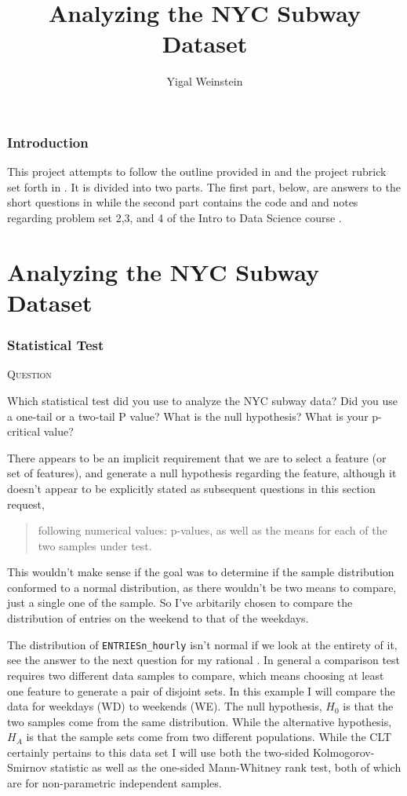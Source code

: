 \documentclass{article}
\title{Analyzing the NYC Subway Dataset}
\author{Yigal Weinstein}
\newcounter{questionCtr}
\newenvironment{question}{%
   \bigskip\noindent%
   \refstepcounter{questionCtr}%
   \textsc{Question \thequestionCtr}%
   \newline%
   }{\par\bigskip}  %
\numberwithin{questionCtr}{section}
\numberwithin{problemCtr}{section}
\begin{document}
\maketitle
\section*{Introduction}
This project attempts to follow the outline provided in \cite{Udacity-P2-DS}
and the project rubrick set forth in \cite{Udacity-P2-rubrick}.  It is divided
into two parts.  The first part, below, are answers to the short questions in
\cite{Udacity-P2-DS} while the second part contains the code and and notes
regarding problem set 2,3, and 4 of the Intro to Data Science course
\cite{Udacity-data-science-course}.
\part{Analyzing the NYC Subway Dataset}
\section{Statistical Test}
\label{sec:statistical_test_one}
\begin{question}
  Which statistical test did you use to analyze the NYC subway data? Did you use
  a one-tail or a two-tail P value? What is the null hypothesis? What is your
  p-critical value?
\end{question}
There appears to be an implicit requirement that we are to select a feature (or
set of features), and generate a null hypothesis regarding the feature, although
it doesn't appear to be explicitly stated as subsequent questions in this
section request,

\begin{quote}
  following numerical values: p-values, as well as the means for each of the two
  samples under test.
\end{quote}

This wouldn't make sense if the goal was to determine if the sample distribution
conformed to a normal distribution, as there wouldn't be two means to compare,
just a single one of the sample.  So I've arbitarily chosen to compare the
distribution of entries on the weekend to that of the weekdays.


The distribution of \verb|ENTRIESn_hourly| isn't normal if we look at the
entirety of it, see the answer to the next question for my rational .  In
general a comparison test requires two different data samples to compare, which
means choosing at least one feature to generate a pair of disjoint sets.  In
this example I will compare the data for weekdays (WD) to weekends (WE).  The
null hypothesis, $H_0$ is that the two samples come from the same distribution.
While the alternative hypothesis, $H_A$ is that the sample sets come from two
different populations. While the CLT certainly pertains to this data set I will
use both the two-sided Kolmogorov-Smirnov statistic
\cite{Scipy-Kolmogorov-Smirnov} as well as the one-sided
Mann-Whitney rank test, \cite{Scipy-mannwhitney} both of which are for
non-parametric independent samples.
\end{document}
